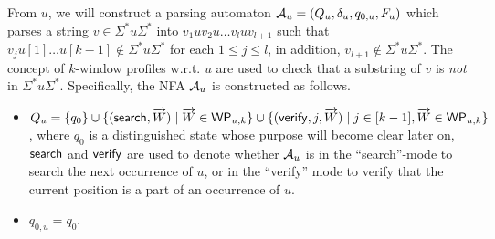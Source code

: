 From $u$, we will construct a parsing automaton $\mathcal{A}_u=(Q_u, \delta_u, q_{0,u}, F_u)$ which parses a string $v \in \Sigma^\ast u \Sigma^\ast$ into $v_1 u v_2 u \dots v_l u v_{l+1}$ such that $v_j u[1] \dots u[k-1] \not \in \Sigma^\ast u \Sigma^\ast$ for each $1 \le j \le l$, in addition, $v_{l+1} \not \in \Sigma^\ast u \Sigma^\ast$. 
The concept of $k$-window profiles w.r.t. $u$ are used to check that a substring of $v$ is \emph{not} in $\Sigma^\ast u \Sigma^\ast$.
Specifically, the NFA $\mathcal{A}_u$ is constructed as follows.
\begin{itemize}
	\item  $Q_u =\{q_0\} \cup \{(\mathsf{search}, \overrightarrow{W}) \mid \overrightarrow{W} \in \mathsf{WP}_{u, k}\} \cup \{(\mathsf{verify}, j, \overrightarrow{W}) \mid j \in [k-1], \overrightarrow{W} \in \mathsf{WP}_{u,k}\}$, where $q_0$ is a distinguished state whose purpose will become clear later on,  $\mathsf{search}$ and $\mathsf{verify}$ are used to denote whether $\mathcal{A}_u$ is in the ``search''-mode to search the next occurrence of $u$, or in the ``verify'' mode to verify that the current position is a part of an occurrence of $u$.
	\item $q_{0,u}=q_0$.
	

\end{itemize}
